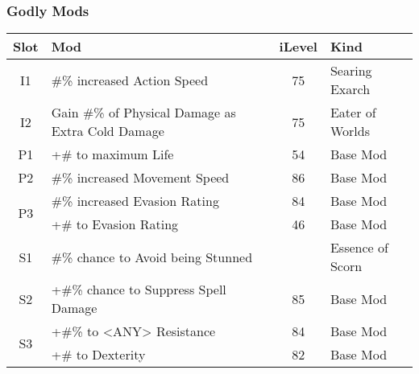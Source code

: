\subsubsection{Godly Mods}
\begin{tabular}{|c|l|c|l|}
	\hline
	Slot&Mod&iLevel&Kind\\\hline
	I1& \#\% increased Action Speed&75& Searing Exarch \\\hline
	I2& Gain \#\% of Physical Damage as Extra Cold Damage&75& Eater of Worlds \\\hline\hline
	P1& +\# to maximum Life&54& Base Mod \\\hline
	P2& \#\% increased Movement Speed&86& Base Mod \\\hline
	\multirow{2}{*}{P3}& \#\% increased Evasion Rating&84& Base Mod \\\cline{2-4}
	& +\# to Evasion Rating&46& Base Mod \\\hline\hline
	S1&\#\% chance to Avoid being Stunned&&Essence of Scorn \\\hline
	S2&+\#\% chance to Suppress Spell Damage&85&Base Mod \\\hline
	\multirow{2}{*}{S3}&+\#\% to <ANY> Resistance&84&Base Mod \\\cline{2-4}
	&+\# to Dexterity&82&Base Mod \\\hline
\end{tabular}


